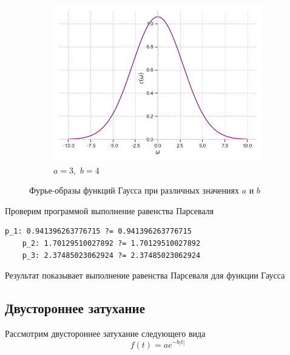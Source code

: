 \documentclass[a4paper, 16pt]{article}
\begin{document}
\begin{figure}[htbp]
\begin{subfigure}{0.3\textwidth}
            \centering
            \includegraphics[width=\linewidth]{gausfimg_a=3_b=4.png}
            \caption{$a=3,\,\,b=4$}
            \label{fig:gausfimg_3}
        \end{subfigure}
        \caption{Фурье-образы функций Гаусса при различных значениях $a$ и $b$}
        \label{fig:gausfimgs}
    \end{figure}


    \noindent Проверим программой выполнение равенства Парсеваля
    \begin{lstlisting}[label=pars_gaus, caption=Равенство Парсеваля для функции Гаусса]
    p_1: 0.941396263776715 ?= 0.941396263776715
    p_2: 1.70129510027892 ?= 1.70129510027892
    p_3: 2.37485023062924 ?= 2.37485023062924
    \end{lstlisting}


    \noindent Результат показывает выполнение равенства Парсеваля для функции Гаусса


    \subsection{Двустороннее затухание}
    \noindent Рассмотрим двустороннее затухание следующего вида
    $$
    f(t)=ae^{-b|t|}
    $$
\end{document}
